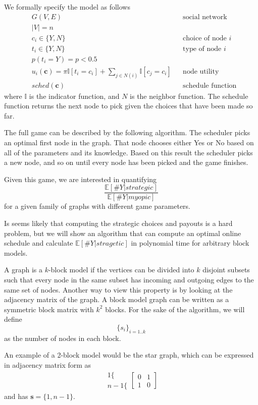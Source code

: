 \documentclass{article}
\begin{document}
We formally specify the model as follows
\begin{align*}
  & G(V,E) && \text{social network} \\
  & |V| = n \\
  & c_i \in \{Y,N\} && \text{choice of node $i$} \\
  & t_i \in \{Y, N\} && \text{type of node $i$} \\
  & p(t_i = Y) = p < 0.5 \\
  & u_i(\mathbf c) = \pi \mathbb I[t_i = c_i] + \sum_{j \in N(i)}
  \mathbb I[c_j = c_i] && \text{node utility} \\
  & sched(\mathbf c) && \text{schedule function}
\end{align*}
where $\mathbb I$ is the indicator function, and $N$ is the neighbor
function. The schedule function returns the next node to pick given
the choices that have been made so far.

The full game can be described by the following algorithm. The
scheduler picks an optimal first node in the graph. That node chooses
either Yes or No based on all of the parameters and its
knowledge. Based on this result the scheduler picks a new node, and so
on until every node has been picked and the game finishes.

Given this game, we are interested in quantifying
\begin{equation*}
  \frac{\mathbb E[\#Y|strategic]}{\mathbb E[\#Y|myopic]}
\end{equation*}
for a given family of graphs with different game parameters.

Is seems likely that computing the strategic choices and payouts is a
hard problem, but we will show an algorithm that can compute an
optimal online schedule and calculate $\mathbb E[\#Y|stragetic]$ in
polynomial time for arbitrary block models.

A graph is a $k$-block model if the vertices can be divided into $k$
disjoint subsets such that every node in the same subset has
incoming and outgoing edges to the same set of nodes. Another way to
view this property is by looking at the adjacency matrix of the
graph. A block model graph can be written as a symmetric block matrix
with $k^2$ blocks. For the sake of the algorithm, we will define
\begin{equation*}
  \{s_i\}_{i=1..k}
\end{equation*}
as the number of nodes in each block.

An example of a 2-block model would be the star graph, which can be
expressed in adjacency matrix form as
\begin{equation*}
  \begin{array}{r}
    1 \{ \\
    n-1 \{
  \end{array}
  \left[ \begin{array}{cc}
      0 & 1 \\
      1 & 0
      \end{array} \right]
\end{equation*}
and has $\mathbf s = \{1, n-1\}$.
\end{document}
